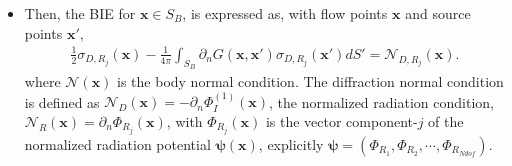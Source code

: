 \documentclass[12pt,a4paper,titlepage]{article}
\newcommand{\bs}{\boldsymbol}
\begin{document}
\begin{itemize}
\item Then, the BIE for $\bs x \in S_B$, is expressed as, with flow points $\bs x$ and source points $\bs x'$,
\begin{align}
\frac{1}{2}\sigma_{D,R_j}(\bs x)-\frac{1}{4\pi}\int_{S_B} \partial_n G(\bs x, \bs x') \sigma_{D,R_j}(\bs x') dS'=\mathcal{N}_{D,R_j}(\bs x). \label{Eq:BIE_source_distribution}
\end{align}
where $\mathcal{N}(\bs x)$ is the body normal condition. The diffraction normal condition is defined as $\mathcal{N}_D (\bs x)=-\partial_{n} \Phi_I^{(1)}(\bs x)$, the normalized radiation condition, $\mathcal{N}_R (\bs x)=\partial_{n} \Phi_{R_j}(\bs x)$, with $\Phi_{R_j}(\bs x)$ is the vector component-$j$ of the normalized radiation potential $\bs \psi(\bs x)$, explicitly $\bs \psi=(\Phi_{R_1},\Phi_{R_2},\cdots,\Phi_{R_{Ndof}})$. 


\end{itemize}
\end{document}
